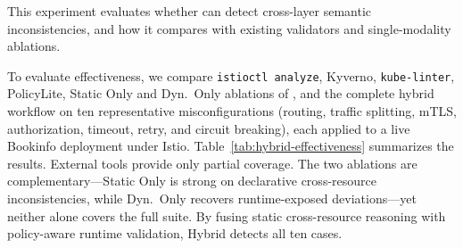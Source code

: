 This experiment evaluates whether \name can detect cross-layer semantic inconsistencies, and how it compares with existing validators and single-modality ablations.

To evaluate effectiveness, we compare \texttt{istioctl analyze}, Kyverno, \texttt{kube-linter}, PolicyLite, Static Only and Dyn.\ Only ablations of \name, and the complete hybrid workflow on ten representative misconfigurations (routing, traffic splitting, mTLS, authorization, timeout, retry, and circuit breaking), each applied to a live Bookinfo deployment under Istio.
Table~\ref{tab:hybrid-effectiveness} summarizes the results.
External tools provide only partial coverage.
The two ablations are complementary---Static Only is strong on declarative cross-resource inconsistencies, while Dyn.\ Only recovers runtime-exposed deviations---yet neither alone covers the full suite.
By fusing static cross-resource reasoning with policy-aware runtime validation, Hybrid \name detects all ten cases.

%
%
%
%
%
